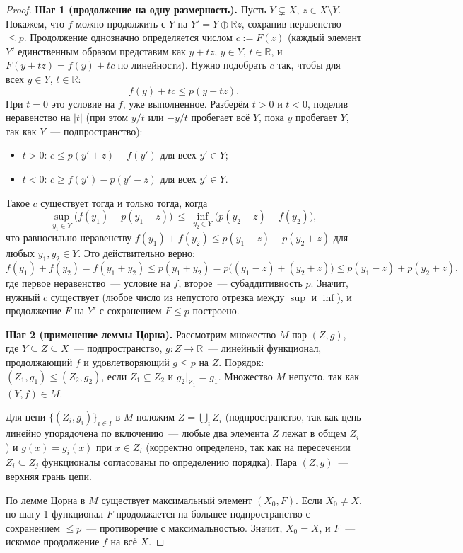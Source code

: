 \documentclass[12pt]{article}
\begin{document}
    \begin{proof}
    	\textbf{Шаг 1 (продолжение на одну размерность).} Пусть $Y \subsetneq X$, $z \in X \setminus Y$. Покажем, что $f$ можно продолжить с $Y$ на $Y' = Y \oplus \mathbb{R}z$, сохранив неравенство $\leqslant p$. Продолжение однозначно определяется числом $c := F(z)$ (каждый элемент $Y'$ единственным образом представим как $y + tz$, $y \in Y$, $t \in \mathbb{R}$, и $F(y+tz) = f(y) + tc$ по линейности). Нужно подобрать $c$ так, чтобы для всех $y \in Y$, $t \in \mathbb{R}$:
    	\[
    	f(y) + tc \leqslant p(y + tz).
    	\]
    	При $t = 0$ это условие на $f$, уже выполненное. Разберём $t > 0$ и $t < 0$, поделив неравенство на $|t|$ (при этом $y/t$ или $-y/t$ пробегает всё $Y$, пока $y$ пробегает $Y$, так как $Y$~--- подпространство):
    	\begin{itemize}
    		\item $t > 0$: $c \leqslant p(y' + z) - f(y')$ для всех $y' \in Y$;
    		\item $t < 0$: $c \geqslant f(y') - p(y' - z)$ для всех $y' \in Y$.
    	\end{itemize}
    	Такое $c$ существует тогда и только тогда, когда
    	\[
    	\sup_{y_1 \in Y} \bigl( f(y_1) - p(y_1 - z) \bigr) \ \leqslant\ \inf_{y_2 \in Y} \bigl( p(y_2 + z) - f(y_2) \bigr),
    	\]
    	что равносильно неравенству $f(y_1) + f(y_2) \leqslant p(y_1 - z) + p(y_2 + z)$ для любых $y_1, y_2 \in Y$. Это действительно верно:
    	\[
    	f(y_1) + f(y_2) = f(y_1 + y_2) \leqslant p(y_1 + y_2) = p\bigl( (y_1 - z) + (y_2 + z) \bigr) \leqslant p(y_1 - z) + p(y_2 + z),
    	\]
    	где первое неравенство~--- условие на $f$, второе~--- субаддитивность $p$. Значит, нужный $c$ существует (любое число из непустого отрезка между $\sup$ и $\inf$), и продолжение $F$ на $Y'$ с сохранением $F \leqslant p$ построено.
    	
    	\textbf{Шаг 2 (применение леммы Цорна).} Рассмотрим множество $M$ пар $(Z, g)$, где $Y \subseteq Z \subseteq X$~--- подпространство, $g: Z \rightarrow \mathbb{R}$~--- линейный функционал, продолжающий $f$ и удовлетворяющий $g \leqslant p$ на $Z$. Порядок: $(Z_1, g_1) \leqslant (Z_2, g_2)$, если $Z_1 \subseteq Z_2$ и $g_2|_{Z_1} = g_1$. Множество $M$ непусто, так как $(Y, f) \in M$.
    	
    	Для цепи $\{ (Z_i, g_i) \}_{i \in I}$ в $M$ положим $Z = \bigcup_i Z_i$ (подпространство, так как цепь линейно упорядочена по включению~--- любые два элемента $Z$ лежат в общем $Z_i$) и $g(x) = g_i(x)$ при $x \in Z_i$ (корректно определено, так как на пересечении $Z_i \subseteq Z_j$ функционалы согласованы по определению порядка). Пара $(Z, g)$~--- верхняя грань цепи.
    	
    	По лемме Цорна в $M$ существует максимальный элемент $(X_0, F)$. Если $X_0 \neq X$, по шагу 1 функционал $F$ продолжается на большее подпространство с сохранением $\leqslant p$~--- противоречие с максимальностью. Значит, $X_0 = X$, и $F$~--- искомое продолжение $f$ на всё $X$.
    \end{proof}
    
\end{document}
